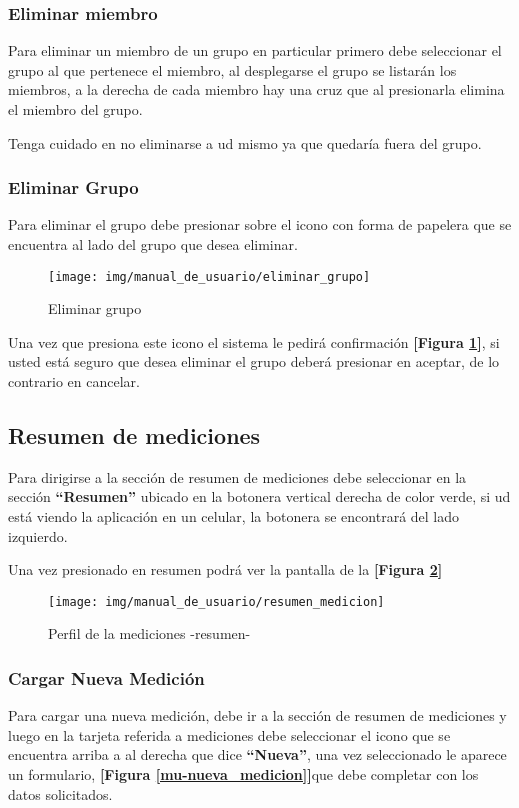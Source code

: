 \subsubsection{Eliminar miembro}
Para eliminar un miembro de un grupo en particular primero debe seleccionar el grupo al que pertenece el miembro, al desplegarse el grupo se listarán los miembros, a la derecha de cada miembro hay una cruz que al presionarla elimina el miembro del grupo.

Tenga cuidado en no eliminarse a ud mismo ya que quedaría fuera del grupo.

\subsubsection{Eliminar Grupo}

Para eliminar el grupo debe presionar sobre el icono con forma de papelera que se encuentra al lado del grupo que desea eliminar.
    \begin{figure}
    	\centering
    	\texttt{[image: img/manual\_de\_usuario/eliminar\_grupo]}
    	\caption{Eliminar grupo}
    	\label{mu-eliminar_grupo}
    \end{figure}
    
 Una vez que presiona este icono el sistema le pedirá confirmación \textbf{[Figura \ref{mu-eliminar_grupo}]}, si usted está seguro que desea eliminar el grupo deberá presionar en aceptar, de lo contrario en cancelar.    
    
   
    
\subsection{Resumen de mediciones}    
Para dirigirse a la sección de resumen de mediciones debe seleccionar en la sección \textbf{``Resumen''} ubicado en la botonera vertical derecha de color verde, si ud está viendo la aplicación en un celular, la botonera se encontrará del lado izquierdo.

Una vez presionado en resumen podrá ver la pantalla de la \textbf{[Figura \ref{mu-resumen_medicion}]}
 

    \begin{figure}
    	\centering
    	\texttt{[image: img/manual\_de\_usuario/resumen\_medicion]}
    	\caption{Perfil de la mediciones -resumen-}
    	\label{mu-resumen_medicion}
    \end{figure}

\clearpage
\subsubsection{Cargar Nueva Medición}
Para cargar una nueva medición, debe ir a la sección de resumen de mediciones y luego en la tarjeta referida a mediciones debe seleccionar el icono que se encuentra arriba a al derecha que dice \textbf{``Nueva''}, una vez seleccionado le aparece un formulario, \textbf{[Figura \ref{mu-nueva_medicion}]}que debe completar con los datos solicitados.

